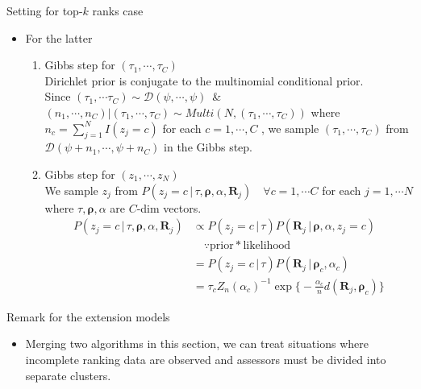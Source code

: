 \documentclass[11pt]{beamer}
\begin{document}
\begin{frame}{Setting for top-$k$ ranks case}
\begin{itemize}
    \item For the latter
        \begin{enumerate}
            \item Gibbs step for $(\tau_1, \cdots, \tau_C)$ \\ Dirichlet prior is conjugate to the multinomial conditional prior. \\ Since $(\tau_1, \cdots \tau_C)\sim \mathcal{D}(\psi, \cdots, \psi)$ \,\& $(n_1, \cdots, n_C)|(\tau_1, \cdots, \tau_C)\sim Multi(N, (\tau_1, \cdots, \tau_C))$ where $n_c=\sum_{j=1}^N I(z_j=c)$ for each $c=1, \cdots ,C$\; , we sample $(\tau_1, \cdots, \tau_C)$ from $\mathcal{D}(\psi+n_1, \cdots, \psi+n_C)$ in the Gibbs step. 
            \item Gibbs step for $(z_1, \cdots, z_N)$ \\ We sample $z_j$ from $P(z_j=c \,|\, \tau, \boldsymbol{\rho}, \alpha, \mathbf{R}_j)\quad \forall c=1, \cdots C$ for each $j=1,\cdots N$ where $\tau, \boldsymbol{\rho}, \alpha$ are $C$-dim vectors. 
            \begin{align*}
                P(z_j=c \,|\, \tau, \boldsymbol{\rho}, \alpha, \mathbf{R}_j) &\propto 
                P(z_j=c\, |\, \tau)P(\mathbf{R}_j \, |\, \boldsymbol{\rho}, \alpha, z_j=c) \\ &\quad \because \text{prior}*\text{likelihood} \\ &= P(z_j=c\, |\, \tau)P(\mathbf{R}_j \, |\, \boldsymbol{\rho}_c, \alpha_c) \\ &= \tau_c Z_n(\alpha_c)^{-1}\exp\Big\{-\frac{\alpha_c}{n}d(\mathbf{R}_j, \boldsymbol{\rho}_c)\Big\}
            \end{align*}
        \end{enumerate}
\end{itemize}
\end{frame}

\begin{frame}{Remark for the extension models}
\begin{itemize}
    \item Merging two algorithms in this section, we can treat situations where incomplete ranking data are observed and assessors must be divided into separate clusters.
\end{itemize}
\end{frame}
\end{document}
